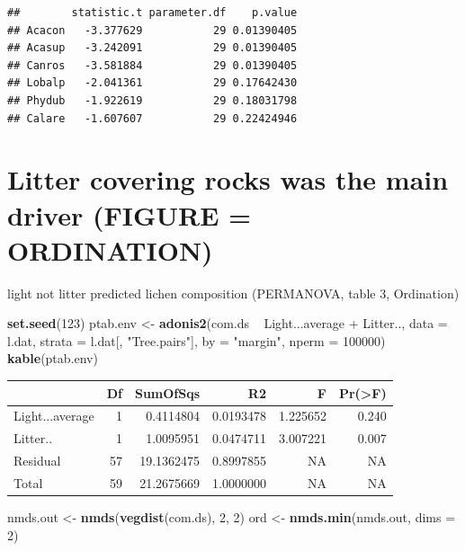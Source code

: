 \documentclass[]{article}
\newenvironment{Shaded}{\begin{snugshade}}{\end{snugshade}}
\newcommand{\KeywordTok}[1]{\textcolor[rgb]{0.13,0.29,0.53}{\textbf{{#1}}}}
\newcommand{\DataTypeTok}[1]{\textcolor[rgb]{0.13,0.29,0.53}{{#1}}}
\newcommand{\DecValTok}[1]{\textcolor[rgb]{0.00,0.00,0.81}{{#1}}}
\newcommand{\StringTok}[1]{\textcolor[rgb]{0.31,0.60,0.02}{{#1}}}
\newcommand{\NormalTok}[1]{{#1}}
\begin{document}
\begin{verbatim}
##        statistic.t parameter.df    p.value
## Acacon   -3.377629           29 0.01390405
## Acasup   -3.242091           29 0.01390405
## Canros   -3.581884           29 0.01390405
## Lobalp   -2.041361           29 0.17642430
## Phydub   -1.922619           29 0.18031798
## Calare   -1.607607           29 0.22424946
\end{verbatim}

\section{Litter covering rocks was the main driver (FIGURE =
ORDINATION)}\label{litter-covering-rocks-was-the-main-driver-figure-ordination}

light not litter predicted lichen composition (PERMANOVA, table 3,
Ordination)

\begin{Shaded}
\begin{Highlighting}[]
\KeywordTok{set.seed}\NormalTok{(}\DecValTok{123}\NormalTok{)}
\NormalTok{ptab.env <-}\StringTok{ }\KeywordTok{adonis2}\NormalTok{(com.ds ~}\StringTok{  }\NormalTok{Light...average +}\StringTok{ }\NormalTok{Litter.., }\DataTypeTok{data =} \NormalTok{l.dat, }
                   \DataTypeTok{strata =} \NormalTok{l.dat[, }\StringTok{"Tree.pairs"}\NormalTok{],  }
                   \DataTypeTok{by =} \StringTok{"margin"}\NormalTok{, }\DataTypeTok{nperm =} \DecValTok{100000}\NormalTok{)}
\KeywordTok{kable}\NormalTok{(ptab.env)}
\end{Highlighting}
\end{Shaded}

\begin{tabular}{l|r|r|r|r|r}
\hline
  & Df & SumOfSqs & R2 & F & Pr(>F)\\
\hline
Light...average & 1 & 0.4114804 & 0.0193478 & 1.225652 & 0.240\\
\hline
Litter.. & 1 & 1.0095951 & 0.0474711 & 3.007221 & 0.007\\
\hline
Residual & 57 & 19.1362475 & 0.8997855 & NA & NA\\
\hline
Total & 59 & 21.2675669 & 1.0000000 & NA & NA\\
\hline
\end{tabular}

\begin{Shaded}
\begin{Highlighting}[]
\NormalTok{nmds.out <-}\StringTok{ }\KeywordTok{nmds}\NormalTok{(}\KeywordTok{vegdist}\NormalTok{(com.ds), }\DecValTok{2}\NormalTok{, }\DecValTok{2}\NormalTok{)}
\NormalTok{ord <-}\StringTok{ }\KeywordTok{nmds.min}\NormalTok{(nmds.out, }\DataTypeTok{dims =} \DecValTok{2}\NormalTok{)}
\end{Highlighting}
\end{Shaded}
\end{document}
